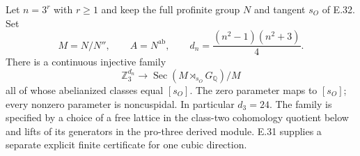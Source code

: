 \begin{theorem}
\label{E-full-metabelian-tower}
Let $n=3^r$ with $r\ge1$ and keep the full profinite
group $N$ and tangent $s_O$ of E.32. Set
\[
 M=N/N'',\qquad A=N^{\mathrm{ab}},\qquad
 d_n=\frac{(n^2-1)(n^2+3)}4.
\]
There is a continuous injective family
\[
 \mathbb Z_3^{d_n}\longrightarrow
 \operatorname{Sec}(M\rtimes_{s_O}G_{\mathbb Q})/M
 \tag{E.33.1}
\]
all of whose abelianized classes equal $[s_O]$.
The zero parameter maps to $[s_O]$; every nonzero
parameter is noncuspidal. In particular $d_3=24$.
The family is specified by a choice of a free lattice
in the class-two cohomology quotient below and lifts
of its generators in the pro-three derived module.
E.31 supplies a separate explicit finite certificate
for one cubic direction.
\end{theorem}
